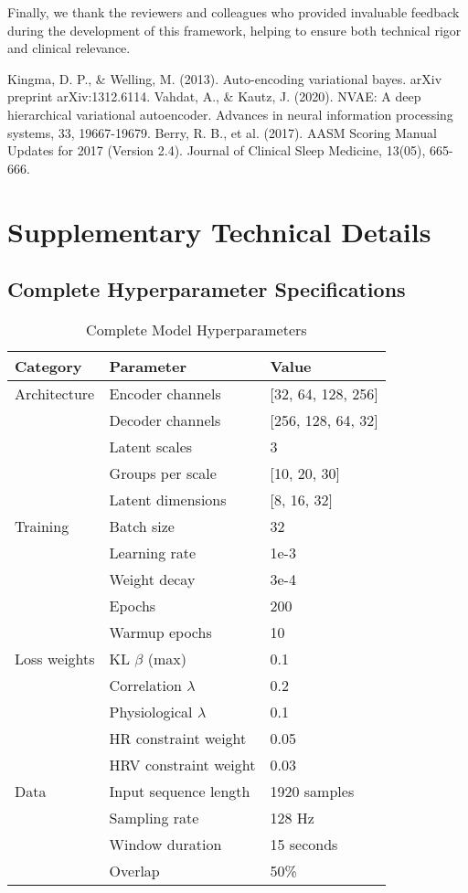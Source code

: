 \documentclass[11pt]{article}
\begin{document}
Finally, we thank the reviewers and colleagues who provided invaluable feedback during the development of this framework, helping to ensure both technical rigor and clinical relevance.

\begin{thebibliography}{99}
 Kingma, D. P., \& Welling, M. (2013). Auto-encoding variational bayes. arXiv preprint arXiv:1312.6114.
 Vahdat, A., \& Kautz, J. (2020). NVAE: A deep hierarchical variational autoencoder. Advances in neural information processing systems, 33, 19667-19679.
 Berry, R. B., et al. (2017). AASM Scoring Manual Updates for 2017 (Version 2.4). Journal of Clinical Sleep Medicine, 13(05), 665-666.
\end{thebibliography}

\appendix

\section{Supplementary Technical Details}
\label{app:technical}

\subsection{Complete Hyperparameter Specifications}

\begin{table}[h]
\centering
\caption{Complete Model Hyperparameters}
\label{tab:complete_hyperparams}
\begin{tabular}{|l|l|l|}
\hline
\textbf{Category} & \textbf{Parameter} & \textbf{Value} \\
\hline
\hline
Architecture & Encoder channels & [32, 64, 128, 256] \\
 & Decoder channels & [256, 128, 64, 32] \\
 & Latent scales & 3 \\
 & Groups per scale & [10, 20, 30] \\
 & Latent dimensions & [8, 16, 32] \\
\hline
Training & Batch size & 32 \\
 & Learning rate & 1e-3 \\
 & Weight decay & 3e-4 \\
 & Epochs & 200 \\
 & Warmup epochs & 10 \\
\hline
Loss weights & KL $\beta$ (max) & 0.1 \\
 & Correlation $\lambda$ & 0.2 \\
 & Physiological $\lambda$ & 0.1 \\
 & HR constraint weight & 0.05 \\
 & HRV constraint weight & 0.03 \\
\hline
Data & Input sequence length & 1920 samples \\
 & Sampling rate & 128 Hz \\
 & Window duration & 15 seconds \\
 & Overlap & 50\% \\
\hline
\end{tabular}
\end{table}
\end{document}
